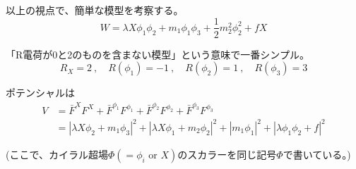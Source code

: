 \documentclass[
  unicode,a4paper,9pt,
  xcolor = {dvipsnames,svgnames},
  hyperref ={colorlinks=true,citecolor=Navy,linkcolor=NavyBlue,urlcolor=purple},
  ja=standard,lualatex
]{beamer}
\begin{document}
\begin{frame}
  \frametitle{\subsecname}

  以上の視点で、簡単な模型を考察する。
  \begin{equation}
    W=\lambda X\phi_{1}\phi_{2}+m_{1}\phi_{1}\phi_{3}+\frac{1}{2}m_{2}^2\phi_{2}^2+fX
    \nonumber
  \end{equation}

  「R電荷が0と2のものを含まない模型」という意味で一番シンプル。
  $$
    R_{X}=2\ , \quad R(\phi_{1})=-1\ , \quad R(\phi_{2})=1\ ,\quad R(\phi_{3})=3
  $$

  ポテンシャルは
  \begin{align}
    V
     & =
    \bar{F}^{X}F^{X}
    +
    \bar{F}^{\phi_{1}}F^{\phi_{1}}
    +
    \bar{F}^{\phi_{2}}F^{\phi_{2}}
    +
    \bar{F}^{\phi_{3}}F^{\phi_{3}}
    \nonumber
    \\
     & =
    |\lambda X\phi_{2}+m_{1}\phi_{3}|^2
    +
    |\lambda X\phi_{1}+m_{2}\phi_{2}|^2
    +
    |m_{1}\phi_{1}|^2
    +
    |\lambda \phi_{1}\phi_{2}+f|^2
    \nonumber
  \end{align}

  (ここで、カイラル超場$\Phi(=\phi_{i}\textrm{\ or\ }X)$のスカラーを同じ記号$\Phi$で書いている。)

\end{frame}
\end{document}
